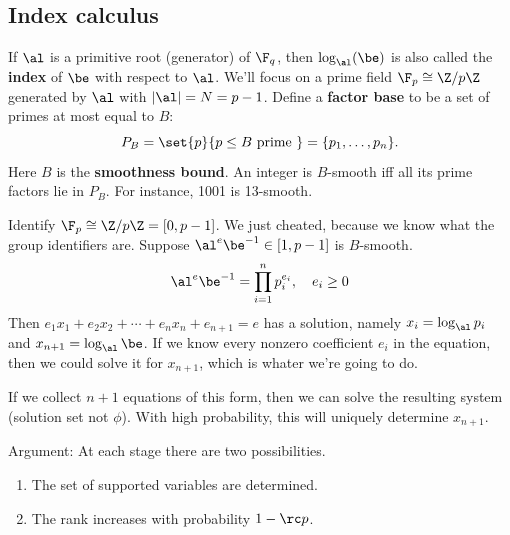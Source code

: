 \subsection{Index calculus}
If $\al$ is a primitive root (generator) of $\F_q$, then $\log_{\al}(\be)$ is also called the \textbf{index} of $\be$ with respect to $\al$. We'll focus on a prime field $\F_p\cong \Z/p\Z$ generated by $\al$ with $|\al|=N=p-1$. Define a \textbf{factor base} to be a set of primes at most equal to $B$:
\[
P_B=\set{p}{p\le B\text{ prime }}=\{p_1,\ldots, p_n\}.
\]
Here $B$ is the \textbf{smoothness bound}. An integer is $B$-smooth iff all its prime factors lie in $P_B$. For instance, 1001 is 13-smooth.

Identify $\F_p\cong \Z/p\Z=[0,p-1]$. We just cheated, because we know what the group identifiers are. Suppose $\al^e\be^{-1}\in [1,p-1]$ is $B$-smooth. 
\[
\al^e\be^{-1}=\prod_{i=1}^n p_i^{e_i},\quad e_i\ge 0 %
\]
Then $e_1x_1+e_2x_2+\cdots +e_nx_n+e_{n+1}=e$ has a solution, namely $x_i=\log_{\al}p_i$ and $x_{n+1}=\log_{\al}\be$.
If we know every nonzero coefficient $e_i$ in the equation, then we could solve it for $x_{n+1}$, which is whater we're going to do.

If we collect $n+1$ equations of this form, then we can solve the resulting system (solution set not $\phi$). With high probability, this will uniquely determine $x_{n+1}$. 

Argument: At each stage there are two possibilities.
\begin{enumerate}
\item
The set of supported variables are determined.
\item  %
The rank increases with probability $1-\rc p$.
\end{enumerate}

